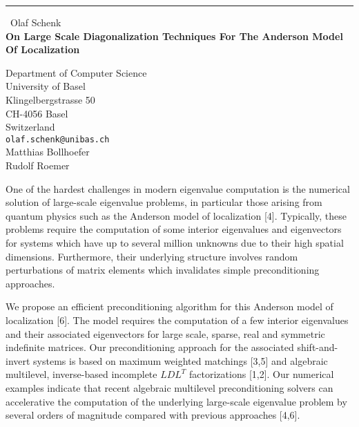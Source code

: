 \documentclass{report}
\begin{document}
\begin{center}
\rule{6in}{1pt} \
{\large Olaf Schenk \\
{\bf On Large Scale Diagonalization Techniques For The Anderson Model Of Localization}}

Department of Computer Science \\ University of Basel \\ Klingelbergstrasse 50 \\ CH-4056 Basel \\ Switzerland
\\
{\tt olaf.schenk@unibas.ch}\\
 Matthias Bollhoefer\\
 Rudolf Roemer\end{center}

One of the hardest challenges in modern eigenvalue computation is the
numerical solution of large-scale eigenvalue problems, in particular those
arising from quantum physics such as the Anderson model of localization
[4]. Typically, these problems require the computation of some
interior eigenvalues and eigenvectors for systems which have up to several
million unknowns due to their high spatial dimensions. Furthermore, their
underlying structure involves random perturbations of matrix elements which
invalidates simple preconditioning approaches.

We propose an efficient preconditioning algorithm for this Anderson model of
localization [6]. The model requires the computation of a few interior
eigenvalues and their associated eigenvectors for large scale, sparse, real
and symmetric indefinite matrices. Our preconditioning approach for the
associated shift-and-invert systems is based on maximum weighted matchings
[3,5] and algebraic multilevel, inverse-based incomplete $LDL^T$
factorizations [1,2]. Our numerical examples indicate that recent algebraic
multilevel preconditioning solvers can accelerative the computation of the
underlying large-scale eigenvalue problem by several orders of magnitude
compared with previous approaches [4,6].
\end{document}
